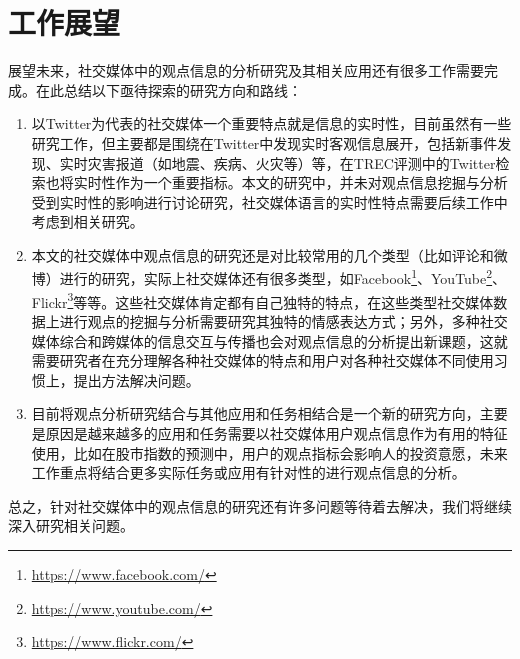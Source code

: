 \section{工作展望}
展望未来，社交媒体中的观点信息的分析研究及其相关应用还有很多工作需要完成。在此总结以下亟待探索的研究方向和路线：
  \begin{enumerate}
  \item 以Twitter为代表的社交媒体一个重要特点就是信息的实时性，目前虽然有一些研究工作，但主要都是围绕在Twitter中发现实时客观信息展开，包括新事件发现、实时灾害报道（如地震、疾病、火灾等）等，在TREC评测中的Twitter检索也将实时性作为一个重要指标。本文的研究中，并未对观点信息挖掘与分析受到实时性的影响进行讨论研究，社交媒体语言的实时性特点需要后续工作中考虑到相关研究。
  
 \item 本文的社交媒体中观点信息的研究还是对比较常用的几个类型（比如评论和微博）进行的研究，实际上社交媒体还有很多类型，如Facebook\footnote{\url{https://www.facebook.com/}}、YouTube\footnote{\url{https://www.youtube.com/}}、 Flickr\footnote{\url{https://www.flickr.com/}}等等。这些社交媒体肯定都有自己独特的特点，在这些类型社交媒体数据上进行观点的挖掘与分析需要研究其独特的情感表达方式；另外，多种社交媒体综合和跨媒体的信息交互与传播也会对观点信息的分析提出新课题，这就需要研究者在充分理解各种社交媒体的特点和用户对各种社交媒体不同使用习惯上，提出方法解决问题。
 
 \item 目前将观点分析研究结合与其他应用和任务相结合是一个新的研究方向，主要是原因是越来越多的应用和任务需要以社交媒体用户观点信息作为有用的特征使用，比如在股市指数的预测中，用户的观点指标会影响人的投资意愿，未来工作重点将结合更多实际任务或应用有针对性的进行观点信息的分析。
  \end{enumerate}
  
总之，针对社交媒体中的观点信息的研究还有许多问题等待着去解决，我们将继续深入研究相关问题。

